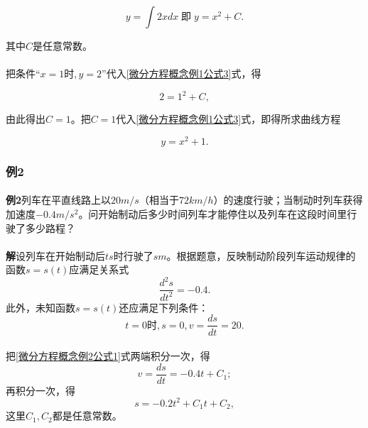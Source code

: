 \begin{equation}
  \label{微分方程概念例1公式3}
  y = \int 2xdx \; \text{即} \; y=x^2 + C.
\end{equation}

其中$C$是任意常数。

\paragraph{}
把条件“$x=1$时$, y=2$”代入\eqref{微分方程概念例1公式3}式，得

\begin{equation}
  \label{微分方程概念例1公式4}
  2 = 1^2 + C,
\end{equation}

由此得出$C=1$。把$C=1$代入\eqref{微分方程概念例1公式3}式，即得所求曲线方程

\begin{equation}
  \label{微分方程概念例1公式5}
  y = x^2 + 1.
\end{equation}

\subsubsection{例2}
\paragraph{}
\textbf{例2\;}列车在平直线路上以$20m/s$（相当于$72 km/h$）的速度行驶；当制动时列车获得加速度$-0.4m/s^2$。问开始制动后多少时间列车才能停住以及列车在这段时间里行驶了多少路程？

\paragraph{}
\textbf{解\;}设列车在开始制动后$t s$时行驶了$s m$。根据题意，反映制动阶段列车运动规律的函数$s=s(t)$应满足关系式
\begin{equation}
  \label{微分方程概念例2公式1}
  \frac{d^2s}{dt^2} = -0.4.
\end{equation}
此外，未知函数$s=s(t)$还应满足下列条件：
\begin{equation}
  \label{微分方程概念例2公式2}
  t = 0 \text{时}, s = 0, v = \frac{ds}{dt} = 20.
\end{equation}

\paragraph{}
把\eqref{微分方程概念例2公式1}式两端积分一次，得
\begin{equation}
  \label{微分方程概念例2公式3}
  v = \frac{ds}{dt} = -0.4t + C_1;
\end{equation}
再积分一次，得
\begin{equation}
  \label{微分方程概念例2公式4}
  s = -0.2t^2 + C_1t + C_2,
\end{equation}
这里$C_1, C_2$都是任意常数。

